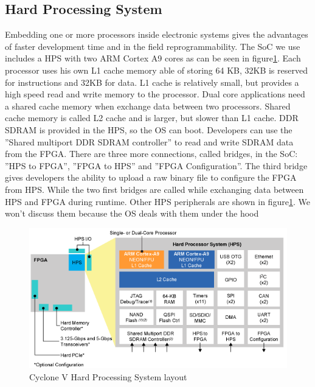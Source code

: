 \documentclass[12pt,a4paper,english,twoside,openright]{tutthesis}
\begin{document}
		\subsection{Hard Processing System}\label{subsec:HPS}
Embedding one or more processors inside electronic systems gives the advantages of faster development time and in the field reprogrammability. The SoC we use includes a HPS with two ARM Cortex A9 cores as can be seen in figure\ref{fig:HPSLayout}. Each processor uses his own L1 cache memory able of storing 64 KB, 32KB is reserved for instructions and 32KB for data. L1 cache is relatively small, but provides a high speed read and write memory to the processor. Dual core applications need a shared cache memory when exchange data between two processors. Shared cache memory is called L2 cache and is larger, but slower than L1 cache. DDR SDRAM is provided in the HPS, so the OS can boot. Developers can use the ''Shared multiport DDR SDRAM controller'' to read and write SDRAM data from the FPGA. There are three more connections, called bridges, in the SoC: ''HPS to FPGA'', ''FPGA to HPS'' and ''FPGA Configuration''. The third bridge gives developers the ability to upload a raw binary file to configure the FPGA from HPS. While the two first bridges are called while exchanging data between HPS and FPGA during runtime. Other HPS peripherals are shown in figure\ref{fig:HPSLayout}. We won't discuss them because the OS deals with them under the hood
\begin{figure}\centering
	\includegraphics[scale=0.7] {images/cycloneVHPS}
	\caption{Cyclone V Hard Processing System layout}\label{fig:HPSLayout}
\end{figure}
\end{document}
